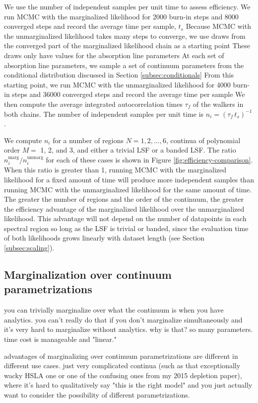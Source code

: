 \documentclass[manuscript]{aastex62}
\begin{document}
We use the number of independent samples per unit time to assess efficiency.
We run MCMC with the marginalized likelihood for 2000 burn-in steps and 8000 converged steps and record the average time per sample, $t_s$
Because MCMC with the unmarginalized likelihood takes many steps to converge, we use draws from the converged part of the marginalized likelihood chain as a starting point
These draws only have values for the absorption line parameters
At each set of absorption line parameters, we sample a set of continuum parameters from the conditional distribution discussed in Section \ref{subsec:conditionals}
From this starting point, we run MCMC with the unmarginalized likelihood for 4000 burn-in steps and 36000 converged steps and record the average time per sample
We then compute the average integrated autocorrelation times $\tau_f$ of the walkers in both chains.
The number of independent samples per unit time is $n_i = \left(\tau_f \, t_s \right)^{-1}$.

We compute $n_i$ for a number of regions $N = 1, 2, \ldots, 6$, continua of polynomial order $M=$ 1, 2, and 3, and either a trivial LSF or a banded LSF.
The ratio $n_i^{\text{marg}} / n_i^{\text{unmarg}}$ for each of these cases is shown in Figure \ref{fig:efficiency-comparison}.
When this ratio is greater than 1, running MCMC with the marginalized likelihood for a fixed amount of time will produce more independent samples than running MCMC with the unmarginalized likelihood for the same amount of time.
The greater the number of regions and the order of the continuum, the greater the efficiency advantage of the marginalized likelihood over the unmarginalized likelihood.
This advantage will not depend on the number of datapoints in each spectral region so long as the LSF is trivial or banded, since the evaluation time of both likelihoods grows linearly with dataset length (see Section \ref{subsec:scaling}).

\subsection{Marginalization over continuum parametrizations}
\label{subsec:contparametrization-marginalization}
you can trivially marginalize over what the continuum is when you have analytics.
you can't really do that if you don't marginalize simultaneously and it's very hard to marginalize without analytics.
why is that? so many parameters.
time cost is manageable and "linear."

advantages of marginalizing over continuum parametrizations are different in different use cases.
just very complicated continua (such as that exceptionally wacky HSLA one or one of the confusing ones from my 2015 depletion paper), where it's hard to qualitatively say "this is the right model" and you just actually want to consider the possibility of different parametrizations.
\end{document}
